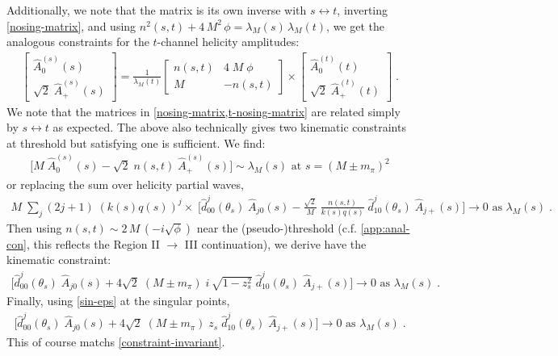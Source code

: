 Additionally, we note that the matrix is its own inverse with \(s\leftrightarrow t\), inverting \cref{nosing-matrix}, and using \(n^2(s,t) + 4 \, M^2 \, \phi = \lambda_M(s) \, \lambda_M(t)\), we get the analogous constraints for the \(t\)-channel helicity amplitudes:
  \begin{align} \label{t-nosing-matrix}
    \begin{bmatrix}
  \hat{A}^{(s)}_{0}(s) \\
  \sqrt{2} \; \hat{A}^{(s)}_{+}(s)
    \end{bmatrix}
    =
    \frac{1}{\lambda_M(t)}
    \begin{bmatrix}
        n(s,t)   &  4 \; M \; \phi \\
        M  & - n(s,t)
    \end{bmatrix}
    \times
    \begin{bmatrix}
  \hat{A}^{(t)}_{0}(t) \\
  \sqrt{2} \;  \hat{A}^{(t)}_{+}(t)
    \end{bmatrix} \; .
  \end{align}
We note that the matrices in \cref{nosing-matrix,t-nosing-matrix} are related simply by \(s\leftrightarrow t\) as expected.
The above also technically gives two kinematic constraints at threshold but satisfying one is sufficient.
 We find:
\begin{align}
      \big[  M \; \hat{A}_0^{(s)}(s) - \sqrt{2} \; n(s,t) \; \hat{A}_+^{(s)}(s) \big]
      \sim \lambda_M(s) \text{ at } s = (M \pm m_\pi)^2
\end{align}
or replacing the sum over helicity partial waves,
\begin{align}
  M \; \sum_{j} (2j+1) \; (k(s)q(s))^j \times \; \bigg[
  \hat{d}_{00}^j(\theta_s) \; \hat{A}_{j0}(s)
  - \frac{\sqrt{2}}{M} \; \frac{n(s,t)}{k(s) q(s)} \; \hat{d}_{10}^j(\theta_s) \; \hat{A}_{j+}(s)
  \bigg] \to 0 \text{ as } \lambda_M(s) \; .
\end{align}
Then using \(n(s,t) \sim 2 \, M \, (-i \sqrt{\phi})\) near the (pseudo-)threshold (c.f. \cref{app:anal-con}, this reflects the Region II \(\to\) III continuation), we derive have the kinematic constraint:
  \begin{align}
    \bigg[
    \hat{d}_{00}^j(\theta_s) \; \hat{A}_{j0}(s)
    + 4\sqrt{2} \; (M\pm m_\pi) \; i \, \sqrt{1 - z_s^2} \; \hat{d}_{10}^j(\theta_s) \; \hat{A}_{j+}(s)
    \bigg] \to 0 \text{ as } \lambda_M(s) \; .
  \end{align}
Finally, using \cref{sin-eps} at the singular points,
\begin{align}
  \bigg[
  \hat{d}_{00}^j(\theta_s) \; \hat{A}_{j0}(s)
  + 4\sqrt{2} \; (M\pm m_\pi) \; z_s \; \hat{d}_{10}^j(\theta_s) \; \hat{A}_{j+}(s)
  \bigg] \to 0 \text{ as } \lambda_M(s) \; .
\end{align}
This of course matchs \cref{constraint-invariant}.
